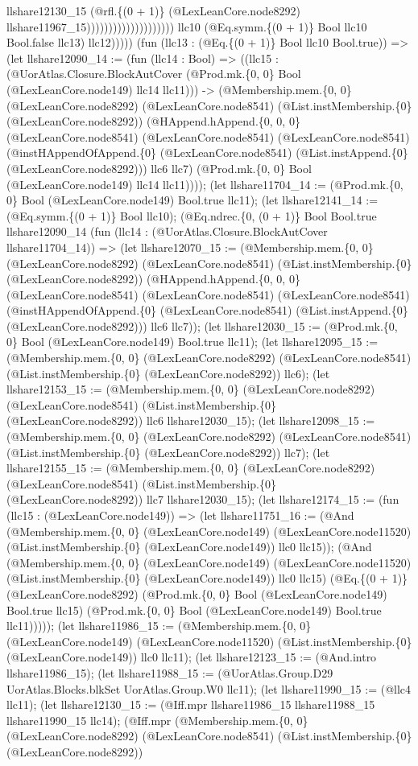 \documentclass[11pt]{article}
\begin{document}
llshare12130\_15 (@rfl.\{(0 + 1)\} (@LexLeanCore.node8292) llshare11967\_15)))))))))))))))))))) llc10 (@Eq.symm.\{(0 + 1)\} Bool llc10 Bool.false llc13) llc12))))) (fun (llc13 : (@Eq.\{(0 + 1)\} Bool llc10 Bool.true)) => (let llshare12090\_14 := (fun (llc14 : Bool) => ((llc15 : (@UorAtlas.Closure.BlockAutCover (@Prod.mk.\{0, 0\} Bool (@LexLeanCore.node149) llc14 llc11))) -> (@Membership.mem.\{0, 0\} (@LexLeanCore.node8292) (@LexLeanCore.node8541) (@List.instMembership.\{0\} (@LexLeanCore.node8292)) (@HAppend.hAppend.\{0, 0, 0\} (@LexLeanCore.node8541) (@LexLeanCore.node8541) (@LexLeanCore.node8541) (@instHAppendOfAppend.\{0\} (@LexLeanCore.node8541) (@List.instAppend.\{0\} (@LexLeanCore.node8292))) llc6 llc7) (@Prod.mk.\{0, 0\} Bool (@LexLeanCore.node149) llc14 llc11)))); (let llshare11704\_14 := (@Prod.mk.\{0, 0\} Bool (@LexLeanCore.node149) Bool.true llc11); (let llshare12141\_14 := (@Eq.symm.\{(0 + 1)\} Bool llc10); (@Eq.ndrec.\{0, (0 + 1)\} Bool Bool.true llshare12090\_14 (fun (llc14 : (@UorAtlas.Closure.BlockAutCover llshare11704\_14)) => (let llshare12070\_15 := (@Membership.mem.\{0, 0\} (@LexLeanCore.node8292) (@LexLeanCore.node8541) (@List.instMembership.\{0\} (@LexLeanCore.node8292)) (@HAppend.hAppend.\{0, 0, 0\} (@LexLeanCore.node8541) (@LexLeanCore.node8541) (@LexLeanCore.node8541) (@instHAppendOfAppend.\{0\} (@LexLeanCore.node8541) (@List.instAppend.\{0\} (@LexLeanCore.node8292))) llc6 llc7)); (let llshare12030\_15 := (@Prod.mk.\{0, 0\} Bool (@LexLeanCore.node149) Bool.true llc11); (let llshare12095\_15 := (@Membership.mem.\{0, 0\} (@LexLeanCore.node8292) (@LexLeanCore.node8541) (@List.instMembership.\{0\} (@LexLeanCore.node8292)) llc6); (let llshare12153\_15 := (@Membership.mem.\{0, 0\} (@LexLeanCore.node8292) (@LexLeanCore.node8541) (@List.instMembership.\{0\} (@LexLeanCore.node8292)) llc6 llshare12030\_15); (let llshare12098\_15 := (@Membership.mem.\{0, 0\} (@LexLeanCore.node8292) (@LexLeanCore.node8541) (@List.instMembership.\{0\} (@LexLeanCore.node8292)) llc7); (let llshare12155\_15 := (@Membership.mem.\{0, 0\} (@LexLeanCore.node8292) (@LexLeanCore.node8541) (@List.instMembership.\{0\} (@LexLeanCore.node8292)) llc7 llshare12030\_15); (let llshare12174\_15 := (fun (llc15 : (@LexLeanCore.node149)) => (let llshare11751\_16 := (@And (@Membership.mem.\{0, 0\} (@LexLeanCore.node149) (@LexLeanCore.node11520) (@List.instMembership.\{0\} (@LexLeanCore.node149)) llc0 llc15)); (@And (@Membership.mem.\{0, 0\} (@LexLeanCore.node149) (@LexLeanCore.node11520) (@List.instMembership.\{0\} (@LexLeanCore.node149)) llc0 llc15) (@Eq.\{(0 + 1)\} (@LexLeanCore.node8292) (@Prod.mk.\{0, 0\} Bool (@LexLeanCore.node149) Bool.true llc15) (@Prod.mk.\{0, 0\} Bool (@LexLeanCore.node149) Bool.true llc11))))); (let llshare11986\_15 := (@Membership.mem.\{0, 0\} (@LexLeanCore.node149) (@LexLeanCore.node11520) (@List.instMembership.\{0\} (@LexLeanCore.node149)) llc0 llc11); (let llshare12123\_15 := (@And.intro llshare11986\_15); (let llshare11988\_15 := (@UorAtlas.Group.D29 UorAtlas.Blocks.blkSet UorAtlas.Group.W0 llc11); (let llshare11990\_15 := (@llc4 llc11); (let llshare12130\_15 := (@Iff.mpr llshare11986\_15 llshare11988\_15 llshare11990\_15 llc14); (@Iff.mpr (@Membership.mem.\{0, 0\} (@LexLeanCore.node8292) (@LexLeanCore.node8541) (@List.instMembership.\{0\} (@LexLeanCore.node8292)) 
\end{document}

